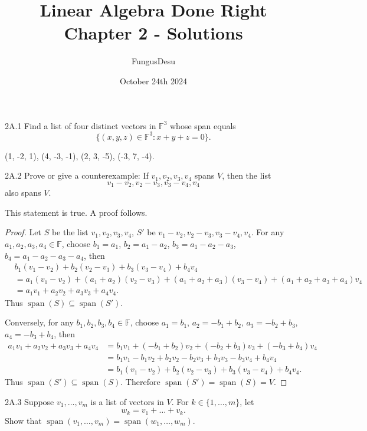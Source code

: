 \documentclass{exam}
\title{Linear Algebra Done Right Chapter 2 - Solutions}
\author{FungusDesu}
\date{October 24th 2024}
\DeclareMathOperator{\spn}{span}
\begin{document}
\maketitle

\begin{problem}{2A.1}
    Find a list of four distinct vectors in $\mathbb F^3$ whose span equals \[
        \{(x, y, z)\in\mathbb F^3 : x + y + z = 0\}.
    \]
\end{problem}
(1, -2, 1), (4, -3, -1), (2, 3, -5), (-3, 7, -4).

\begin{problem}{2A.2}
    Prove or give a counterexample: If $v_1,v_2,v_3,v_4$ spans $V$, then the list \[
        v_1 - v_2, v_2 - v_3, v_3 - v_4, v_4
    \]
    also spans $V$.
\end{problem}
This statement is true. A proof follows.
\begin{proof}
    Let $S$ be the list $v_1,v_2,v_3,v_4$, $S'$ be $v_1 - v_2,v_2-v_3, v_3-v_4, v_4$. For any $a_1, a_2, a_3, a_4\in\mathbb F$, choose $b_1 = a_1$, $b_2 = a_1 - a_2$, $b_3 = a_1 - a_2 - a_3$, $b_4 = a_1 - a_2 - a_3 - a_4$, then
    \begin{align*}
        &b_1(v_1 - v_2) + b_2(v_2 - v_3) + b_3(v_3 - v_4) + b_4v_4\\
        &= a_1(v_1 - v_2) + (a_1 + a_2)(v_2 - v_3) + (a_1 + a_2 + a_3)(v_3 - v_4) + (a_1 + a_2 + a_3 + a_4)v_4\\
        &= a_1v_1 + a_2v_2+ a_3v_3 + a_4v_4.
    \end{align*}
    Thus $\spn(S) \subseteq \spn(S')$.

    Conversely, for any $b_1, b_2, b_3, b_4\in\mathbb F$, choose $a_1 = b_1$, $a_2 = -b_1 + b_2$, $a_3 = - b_2 + b_3$, $a_4 = -b_3 + b_4$, then
    \begin{align*}
        a_1v_1 + a_2v_2 + a_3v_3 + a_4v_4 &= b_1v_1 + (-b_1 + b_2)v_2 + (- b_2 + b_3)v_3 + (- b_3 + b_4)v_4\\
        &=b_1v_1 -b_1v_2 + b_2v_2 - b_2v_3 + b_3v_3 - b_3v_4 + b_4v_4\\
        &=b_1(v_1 - v_2) + b_2(v_2-v_3) + b_3(v_3 - v_4) + b_4v_4.
\end{align*}
    Thus $\spn(S')\subseteq\spn(S)$. Therefore $\spn(S') = \spn(S) = V$.
\end{proof}

\begin{problem}{2A.3}
    Suppose $v_1,\dots,v_m$ is a list of vectors in $V$. For $k\in\{1,\dots,m\}$, let \[
        w_k = v_1 + \dots + v_k.
    \]
    Show that $\spn(v_1,\dots,v_m) = \spn(w_1,\dots,w_m)$.
\end{problem}
\end{document}
